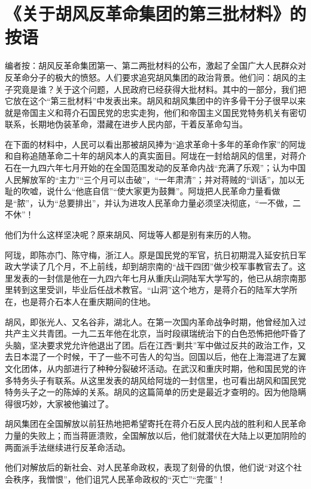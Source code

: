\section[《关于胡风反革命集团的第三批材料》的按语（一九五五年六月十日）]{《关于胡风反革命集团的第三批材料》的按语}


编者按：胡风反革命集团第一、第二两批材料的公布，激起了全国广大人民群众对反革命分子的极大的愤怒。人们要求追究胡风集团的政治背景。他们问：胡风的主子究竟是谁？关于这个问题，人民政府已经获得大批材料。其中的一部分，我们把它放在这个“第三批材料”中发表出来。胡风和胡风集团中的许多骨干分子很早以来就是帝国主义和蒋介石国民党的忠实走狗，他们和帝国主义国民党特务机关有密切联系，长期地伪装革命，潜藏在进步人民内部，干着反革命勾当。

在下面的材料中，人民可以看出那被胡风捧为“追求革命十多年的革命作家”的阿垅和自称追随革命二十年的胡风本人的真实面目。阿垅在一封给胡风的信里，对蒋介石在一九四六年七月开始的在全国范围发动的反革命内战“充满了乐观”；认为中国人民解放军的“主力”“三个月可以击破”，“一年肃清”；并对蒋贼的“训话”，加以无耻的吹嘘，说什么“他底自信”“使大家更为鼓舞”。阿垅把人民革命力量看做是“脓”，认为“总要排出”，并认为进攻人民革命力量必须坚决彻底，“一不做，二不休”！

他们为什么这样坚决呢？原来胡风、阿垅等人都是别有来历的人物。

阿珑，即陈亦门、陈守梅，浙江人。原是国民党的军官，抗日初期混入延安抗日军政大学读了几个月，不上前线，却到胡宗南的“战干四团”做少校军事教官去了。这里发表的一封信是他在一九四六年七月从重庆山洞陆军大学写的，他已从胡宗南那里转到这里受训，毕业后任战术教官。“山洞”这个地方，是蒋介石的陆军大学所在，也是蒋介石本人在重庆期间的住地。

胡风，即张光人、又名谷非，湖北人。在第一次国内革命战争时期，他曾经加入过共产主义共青团。一九二五年他在北京，当时段祺瑞统治下的白色恐怖把他吓昏了头脑，坚决要求党允许他退出了团。后在江西“剿共”军中做过反共的政治工作，又去日本混了一个时候，干了一些不可告人的勾当。回国以后，他在上海混进了左翼文化团体，从内部进行了种种分裂破坏活动。在武汉和重庆时期，他和国民党的许多特务头子有联系。从这里发表的胡风给阿垅的一封信里，也可看出胡风和国民党特务头子之一的陈焯的关系。胡风的这篇简单的历史是最近才查明的。因为他隐瞒得很巧妙，大家被他骗过了。

胡风集团在全国解放以前狂热地把希望寄托在蒋介石反人民内战的胜利和人民革命力量的失败上；而当蒋匪溃败，全国解放以后，他们就潜伏在大陆上以更加阴险的两面派手法继续进行反革命活动。

他们对解放后的新社会、对人民革命政权，表现了刻骨的仇恨，他们说“对这个社会秩序，我憎恨”，他们诅咒人民革命政权的“灭亡”“完蛋”！

